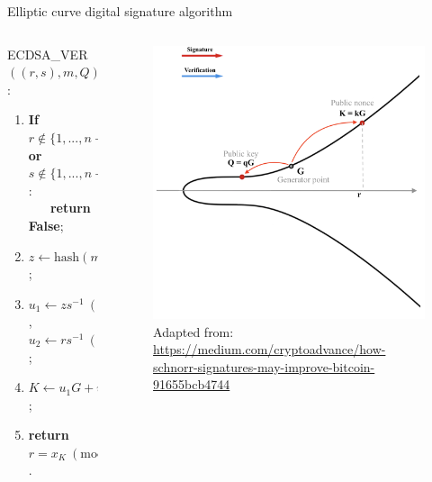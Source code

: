 \documentclass[slidescentered]{beamer}
\newcommand{\source}[1]{\caption*{\tiny Adapted from: {#1}} }
\begin{document}
	\begin{frame}{Elliptic curve digital signature algorithm}
		\begin{columns}
			\begin{column}{0.6\linewidth}
				ECDSA\_VER$((r,s), m, Q)$:
				\begin{enumerate}
					\item<2 -> \textbf{If} $r \notin \{1, ..., n - 1\}$ \textbf{or} $s \notin \{1, ..., n - 1\}$: \\ \textbf{\ \ \ return False};
					\item<3 -> $z \gets \text{hash}(m)$;
					\item<4 -> $u_1 \gets zs^{-1} \ (\text{mod} \ n)$, $u_2 \gets rs^{-1} \ (\text{mod} \ n)$;
					\item<5 -> $K \gets u_1G + u_2Q$;
					\item<8 -> \textbf{return $r = x_K \ (\text{mod} \ n)$}.
				\end{enumerate}
			\end{column}
			\begin{column}{0.5\linewidth}
				\begin{figure}
					 {\vspace*{-0.7cm}
						\hspace*{-1.7cm}
						\includegraphics[scale=0.29]{images/ECDSA4}
						\source{\tiny \url{https://medium.com/cryptoadvance/how-schnorr-signatures-may-improve-bitcoin-91655bcb4744}}}

\end{figure}
\end{column}
\end{columns}
\end{frame}
\end{document}
